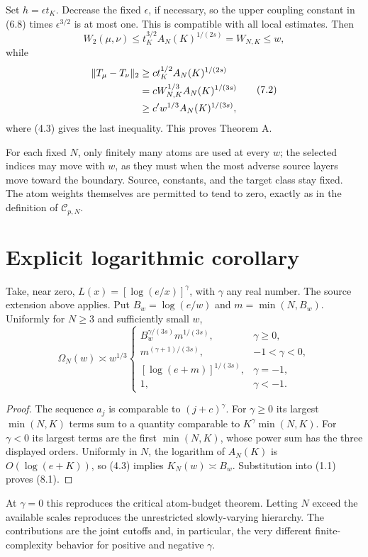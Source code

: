 Set $h=\epsilon t_K$. Decrease the fixed $\epsilon$, if necessary, so the upper coupling constant in (6.8) times $\epsilon^{3/2}$ is at most one. This is compatible with all local estimates. Then
\[
 W_2(\mu,\nu)\le t_K^{3/2}A_N(K)^{1/(2s)}=W_{N,K}\le w,
\]
while
\begin{equation}
 \begin{aligned}
 \lVert T_\mu-T_\nu\rVert_2
 &\ge ct_K^{1/2}A_N(K)^{1/(2s)}\\
 &=cW_{N,K}^{1/3}A_N(K)^{1/(3s)}\\
 &\ge c'w^{1/3}A_N(K)^{1/(3s)},
 \end{aligned}\tag{7.2}
\end{equation}
where (4.3) gives the last inequality. This proves Theorem A.

For each fixed $N$, only finitely many atoms are used at every $w$; the selected indices may move with $w$, as they must when the most adverse source layers move toward the boundary. Source, constants, and the target class stay fixed. The atom weights themselves are permitted to tend to zero, exactly as in the definition of $\mathcal C_{p,N}$.

\section{Explicit logarithmic corollary}
Take, near zero, $L(x)=[\log(e/x)]^\gamma$, with $\gamma$ any real number. The source extension above applies. Put $B_w=\log(e/w)$ and $m=\min(N,B_w)$. Uniformly for $N\ge3$ and sufficiently small $w$,
\begin{equation}
 \Omega_N(w)\asymp w^{1/3}
 \begin{cases}
 B_w^{\gamma/(3s)}m^{1/(3s)},&\gamma\ge0,\\
 m^{(\gamma+1)/(3s)},&-1<\gamma<0,\\
 [\log(e+m)]^{1/(3s)},&\gamma=-1,\\
 1,&\gamma<-1.
 \end{cases}\tag{8.1}
\end{equation}
\begin{proof}
The sequence $a_j$ is comparable to $(j+c)^\gamma$. For $\gamma\ge0$ its largest $\min(N,K)$ terms sum to a quantity comparable to $K^\gamma\min(N,K)$. For $\gamma<0$ its largest terms are the first $\min(N,K)$, whose power sum has the three displayed orders. Uniformly in $N$, the logarithm of $A_N(K)$ is $O(\log(e+K))$, so (4.3) implies $K_N(w)\asymp B_w$. Substitution into (1.1) proves (8.1).
\end{proof}
At $\gamma=0$ this reproduces the critical atom-budget theorem. Letting $N$ exceed the available scales reproduces the unrestricted slowly-varying hierarchy. The contributions are the joint cutoffs and, in particular, the very different finite-complexity behavior for positive and negative $\gamma$.

